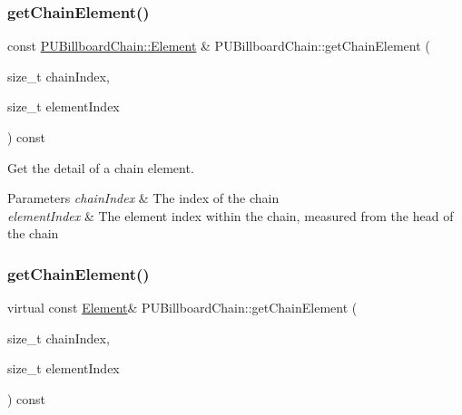 \mbox{\label{classPUBillboardChain_a7ecf145713f707f5d75a796b11f2b3e9}} 
\subsubsection{\texorpdfstring{get\+Chain\+Element()}{getChainElement()}\hspace{0.1cm}{\footnotesize\ttfamily [1/2]}}
{\footnotesize\ttfamily const \hyperlink{classPUBillboardChain_1_1Element}{P\+U\+Billboard\+Chain\+::\+Element} \& P\+U\+Billboard\+Chain\+::get\+Chain\+Element (\begin{DoxyParamCaption}\item[{size\+\_\+t}]{chain\+Index,  }\item[{size\+\_\+t}]{element\+Index }\end{DoxyParamCaption}) const\hspace{0.3cm}{\ttfamily [virtual]}}

Get the detail of a chain element. 
\begin{DoxyParams}{Parameters}
{\em chain\+Index} & The index of the chain \\
\hline
{\em element\+Index} & The element index within the chain, measured from the \textquotesingle{}head\textquotesingle{} of the chain \\
\hline
\end{DoxyParams}
\mbox{\label{classPUBillboardChain_ab333fca0952c36d1578d9160d1da6c1a}} 
\subsubsection{\texorpdfstring{get\+Chain\+Element()}{getChainElement()}\hspace{0.1cm}{\footnotesize\ttfamily [2/2]}}
{\footnotesize\ttfamily virtual const \hyperlink{classPUBillboardChain_1_1Element}{Element}\& P\+U\+Billboard\+Chain\+::get\+Chain\+Element (\begin{DoxyParamCaption}\item[{size\+\_\+t}]{chain\+Index,  }\item[{size\+\_\+t}]{element\+Index }\end{DoxyParamCaption}) const\hspace{0.3cm}{\ttfamily [virtual]}}

